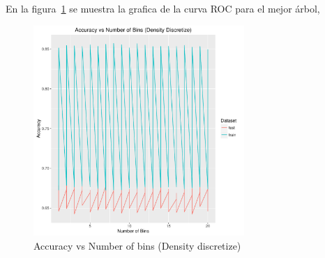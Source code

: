 En la figura~\ref{fig:6f} se muestra la grafica de la curva ROC para el mejor árbol,

\begin{figure}
  \centering
  \includegraphics[width = 8cm]{6f.pdf}
  \caption{Accuracy vs Number of bins (Density discretize)}
  \label{fig:6f}
\end{figure}




